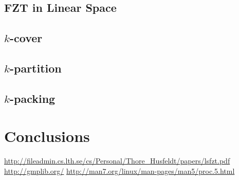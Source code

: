\documentclass[a4paper, titlepage]{article}
\begin{document}
\subsection{FZT in Linear Space}

\subsection{$k$-cover}

\subsection{$k$-partition}

\subsection{$k$-packing}

\section{Conclusions}

\begin{thebibliography}{9}
 \url{http://fileadmin.cs.lth.se/cs/Personal/Thore_Husfeldt/papers/lsfzt.pdf}
 \url{http://gmplib.org/}
 \url{http://man7.org/linux/man-pages/man5/proc.5.html}
\end{thebibliography}
\end{document}
